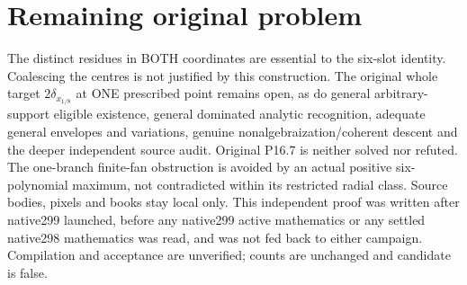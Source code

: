 \documentclass[11pt]{article}
\begin{document}
\section{Remaining original problem}
The distinct residues in BOTH coordinates are essential to the six-slot
identity. Coalescing the centres is not justified by this construction.
The original whole target $2\delta_{x_{1/8}}$ at ONE prescribed point
remains open, as do general arbitrary-support eligible existence,
general dominated analytic recognition, adequate general envelopes and
variations, genuine nonalgebraization/coherent descent and the deeper
independent source audit. Original P16.7 is neither solved nor refuted.
The one-branch finite-fan obstruction is avoided by an actual positive
six-polynomial maximum, not contradicted within its restricted radial
class. Source bodies, pixels and books stay local only.
This independent proof was written after native299 launched, before any
native299 active mathematics or any settled native298 mathematics was
read, and was not fed back to either campaign. Compilation and acceptance
are unverified; counts are unchanged and candidate is false.
\end{document}
